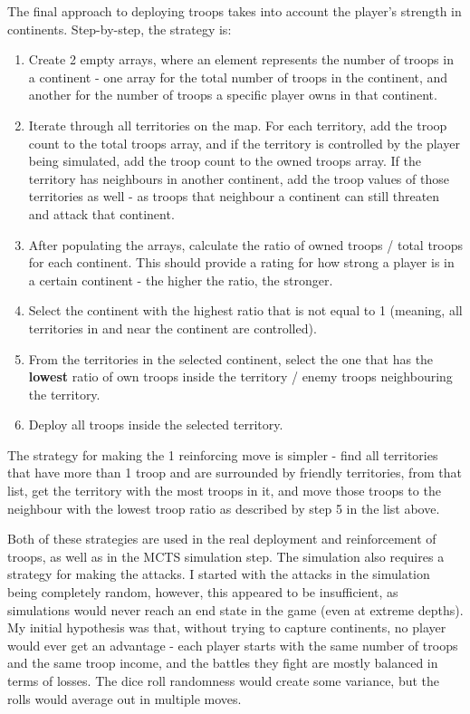 The final approach to deploying troops takes into account the player's strength in continents. Step-by-step, the strategy is:
\begin{enumerate}
\item Create 2 empty arrays, where an element represents the number of troops in a continent - one array for the total number of troops in the continent, and another for the number of troops a specific player owns in that continent.
\item Iterate through all territories on the map. For each territory, add the troop count to the total troops array, and if the territory is controlled by the player being simulated, add the troop count to the owned troops array. If the territory has neighbours in another continent, add the troop values of those territories as well - as troops that neighbour a continent can still threaten and attack that continent.
\item After populating the arrays, calculate the ratio of owned troops / total troops for each continent. This should provide a rating for how strong a player is in a certain continent - the higher the ratio, the stronger.
\item Select the continent with the highest ratio that is not equal to 1 (meaning, all territories in and near the continent are controlled).
\item From the territories in the selected continent, select the one that has the \textbf{lowest} ratio of own troops inside the territory / enemy troops neighbouring the territory.
\item Deploy all troops inside the selected territory.
\end{enumerate}

The strategy for making the 1 reinforcing move is simpler - find all territories that have more than 1 troop and are surrounded by friendly territories, from that list, get the territory with the most troops in it, and move those troops to the neighbour with the lowest troop ratio as described by step 5 in the list above.

Both of these strategies are used in the real deployment and reinforcement of troops, as well as in the MCTS simulation step. The simulation also requires a strategy for making the attacks. I started with the attacks in the simulation being completely random, however, this appeared to be insufficient, as simulations would never reach an end state in the game (even at extreme depths). My initial hypothesis was that, without trying to capture continents, no player would ever get an advantage - each player starts with the same number of troops and the same troop income, and the battles they fight are mostly balanced in terms of losses. The dice roll randomness would create some variance, but the rolls would average out in multiple moves.


